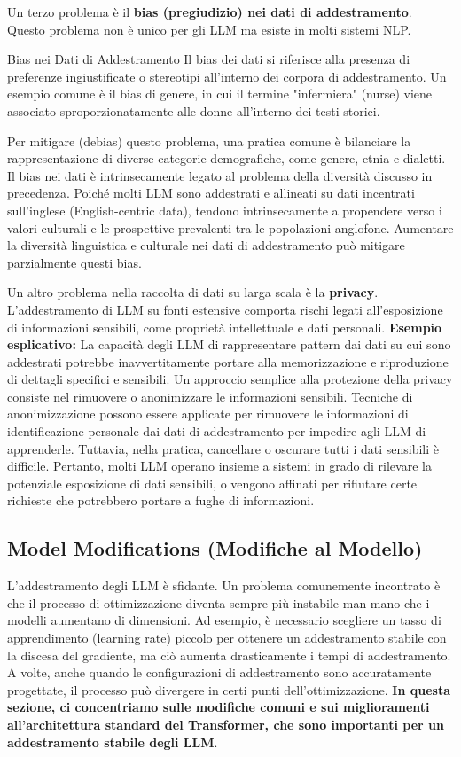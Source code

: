 Un terzo problema è il \textbf{bias (pregiudizio) nei dati di addestramento}. Questo problema non è unico per gli LLM ma esiste in molti sistemi NLP.
\begin{definition}{Bias nei Dati di Addestramento}
Il bias dei dati si riferisce alla presenza di preferenze ingiustificate o stereotipi all'interno dei corpora di addestramento. Un esempio comune è il bias di genere, in cui il termine "infermiera" (nurse) viene associato sproporzionatamente alle donne all'interno dei testi storici.
\end{definition}
Per mitigare (debias) questo problema, una pratica comune è bilanciare la rappresentazione di diverse categorie demografiche, come genere, etnia e dialetti. Il bias nei dati è intrinsecamente legato al problema della diversità discusso in precedenza. Poiché molti LLM sono addestrati e allineati su dati incentrati sull'inglese (English-centric data), tendono intrinsecamente a propendere verso i valori culturali e le prospettive prevalenti tra le popolazioni anglofone. Aumentare la diversità linguistica e culturale nei dati di addestramento può mitigare parzialmente questi bias.

Un altro problema nella raccolta di dati su larga scala è la \textbf{privacy}. L'addestramento di LLM su fonti estensive comporta rischi legati all'esposizione di informazioni sensibili, come proprietà intellettuale e dati personali.
\textbf{Esempio esplicativo:} La capacità degli LLM di rappresentare pattern dai dati su cui sono addestrati potrebbe inavvertitamente portare alla memorizzazione e riproduzione di dettagli specifici e sensibili.
Un approccio semplice alla protezione della privacy consiste nel rimuovere o anonimizzare le informazioni sensibili. Tecniche di anonimizzazione possono essere applicate per rimuovere le informazioni di identificazione personale dai dati di addestramento per impedire agli LLM di apprenderle. Tuttavia, nella pratica, cancellare o oscurare tutti i dati sensibili è difficile. Pertanto, molti LLM operano insieme a sistemi in grado di rilevare la potenziale esposizione di dati sensibili, o vengono affinati per rifiutare certe richieste che potrebbero portare a fughe di informazioni.

\subsection{Model Modifications (Modifiche al Modello)}
L'addestramento degli LLM è sfidante. Un problema comunemente incontrato è che il processo di ottimizzazione diventa sempre più instabile man mano che i modelli aumentano di dimensioni. Ad esempio, è necessario scegliere un tasso di apprendimento (learning rate) piccolo per ottenere un addestramento stabile con la discesa del gradiente, ma ciò aumenta drasticamente i tempi di addestramento. A volte, anche quando le configurazioni di addestramento sono accuratamente progettate, il processo può divergere in certi punti dell'ottimizzazione. \textbf{In questa sezione, ci concentriamo sulle modifiche comuni e sui miglioramenti all'architettura standard del Transformer, che sono importanti per un addestramento stabile degli LLM}.

